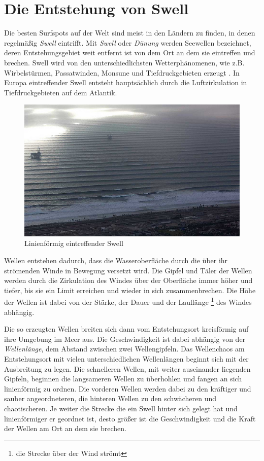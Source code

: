 \section{Die Entstehung von Swell}
Die besten Surfspots auf der Welt sind meist in den Ländern zu finden,
in denen regelmäßig \textit{Swell} eintrifft. Mit \textit{Swell} oder
\textit{Dünung} werden Seewellen bezeichnet, deren Entstehungs\-gebiet
weit entfernt ist von dem Ort an dem sie eintreffen und brechen. Swell
wird von den unterschiedlichsten Wetter\-phänomenen, wie
z.B. Wirbelstürmen, Passatwinden, Monsune und Tiefdruckgebieten
erzeugt \cite[S.15]{storm_europe_1998}. In Europa eintreffender Swell
entsteht hauptsächlich durch die Luftzirkulation in Tiefdruckgebieten
auf dem Atlantik.

\begin{figure}[h]
  \begin{center}
    \includegraphics{bilder/swell}
    \caption{Linienförmig eintreffender Swell}
  \end{center}
\end{figure}

Wellen entstehen dadurch, dass die Wasseroberfläche durch die über ihr
strömenden Winde in Bewegung versetzt wird. Die Gipfel und Täler der
Wellen werden durch die Zirkulation des Windes über der Oberfläche
immer höher und tiefer, bis sie ein Limit erreichen und wieder in sich
zusammenbrechen. Die Höhe der Wellen ist dabei von der Stärke, der
Dauer und der Lauflänge \footnote{die Strecke über der Wind strömt}
des Windes abhängig.

Die so erzeugten Wellen breiten sich dann vom Entstehungsort
kreisförmig auf ihre Umgebung im Meer aus. Die Geschwindigkeit ist
dabei abhängig von der \textit{Wellenlänge}, dem Abstand zwischen zwei
Wellengipfeln. Das Wellenchaos am Entstehungsort mit vielen
unterschiedlichen Wellenlängen beginnt sich mit der Ausbreitung zu
legen. Die schnelleren Wellen, mit weiter auseinander liegenden
Gipfeln, beginnen die langsameren Wellen zu überhohlen und fangen an
sich linienförmig zu ordnen. Die vorderen Wellen werden dabei zu den
kräftiger und sauber angeordneteren, die hinteren Wellen zu den
schwächeren und chaotischeren. Je weiter die Strecke die ein Swell
hinter sich gelegt hat und linienförmiger er geordnet ist, desto
größer ist die Geschwindigkeit und die Kraft der Wellen am Ort an dem
sie brechen.

